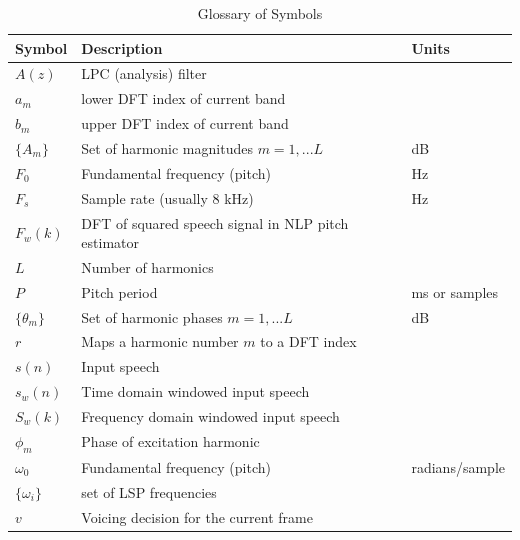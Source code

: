 \documentclass{article}
\begin{document}
\begin{table}[H]
\label{tab:symbol_glossary}
\centering
\begin{tabular}{l l l }
\hline
Symbol & Description & Units \\
\hline
$A(z)$ & LPC (analysis) filter \\
$a_m$ & lower DFT index of current band \\
$b_m$ & upper DFT index of current band \\
$\{A_m\}$ & Set of harmonic magnitudes $m=1,...L$ & dB \\
$F_0$ & Fundamental frequency (pitch) & Hz \\
$F_s$ & Sample rate (usually 8 kHz) & Hz \\
$F_w(k)$ & DFT of squared speech signal in NLP pitch estimator \\
$L$ & Number of harmonics \\
$P$ & Pitch period & ms or samples \\
$\{\theta_m\}$ & Set of harmonic phases $m=1,...L$ & dB \\
$r$ & Maps a harmonic number $m$ to a DFT index \\
$s(n)$ & Input speech \\
$s_w(n)$ & Time domain windowed input speech \\
$S_w(k)$ & Frequency domain windowed input speech \\
$\phi_m$ & Phase of excitation harmonic \\
$\omega_0$ & Fundamental frequency (pitch) & radians/sample \\
$\{\omega_i\}$ & set of LSP frequencies \\
$v$ & Voicing decision for the current frame \\
\hline
\end{tabular}
\caption{Glossary of Symbols}
\end{table}



\end{document}
